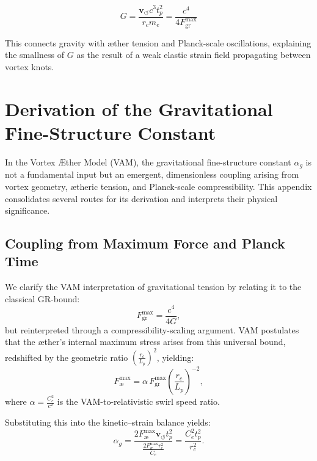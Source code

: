 \documentclass[12pt]{article}
\begin{document}
\begin{equation}
    \boxed{G = \frac{\mathbf{v}_{\scriptscriptstyle\boldsymbol{\circlearrowleft}} c^3 t_p^2}{r_c m_e} = \frac{c^4}{4 F^{\text{max}}_{\text{gr}}}}
\end{equation}

This connects gravity with æther tension and Planck-scale oscillations, explaining the smallness of \( G \) as the result of a weak elastic strain field propagating between vortex knots.
\section{Derivation of the Gravitational Fine-Structure Constant}
\label{appendix:alpha_g}

In the Vortex Æther Model (VAM), the gravitational fine-structure constant $\alpha_g$ is not a fundamental input but an emergent, dimensionless coupling arising from vortex geometry, ætheric tension, and Planck-scale compressibility. This appendix consolidates several routes for its derivation and interprets their physical significance.

\subsection*{Coupling from Maximum Force and Planck Time}

We clarify the VAM interpretation of gravitational tension by relating it to the classical GR-bound:
\begin{equation}
    F^{\text{max}}_{\text{gr}} = \frac{c^4}{4G},
\end{equation}
but reinterpreted through a compressibility-scaling argument. VAM postulates that the æther's internal maximum stress arises from this universal bound, redshifted by the geometric ratio \( \left(\frac{r_c}{L_p}\right)^2 \), yielding:
\begin{equation}
    F^{\text{max}}_{\text{\ae}} = \alpha \, F^{\text{max}}_{\text{gr}} \left(\frac{r_c}{L_p}\right)^{-2}, \label{eq:FmaxVAM}
\end{equation}
where \( \alpha = \frac{C_e^2}{c^2} \) is the VAM-to-relativistic swirl speed ratio.

Substituting this into the kinetic–strain balance yields:
\begin{equation}
    \alpha_g = \frac{2 F^{\text{max}}_{\text{\ae}} \mathbf{v}_{\scriptscriptstyle\boldsymbol{\circlearrowleft}} t_p^2}{\frac{2 F^{\text{max}}_{\text{\ae}} r_c^2}{C_e}} = \frac{C_e^2 t_p^2}{r_c^2}.
\end{equation}
\end{document}

